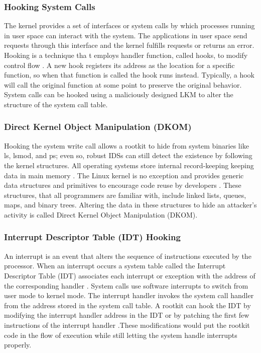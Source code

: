 \subsubsection{Hooking System Calls}
The kernel provides a set  of  interfaces or system calls by which processes running
 in user space can interact with the system. The applications in user space send requests
 through this interface and the kernel fulfills requests or returns an error. Hooking is a technique tha
t employs handler function, called hooks, to modify
 control flow . A new hook registers its address as the location for a specific
function, so when that function is called the hook runs instead. Typically, a hook will call
 the original function at some point to preserve the original behavior. System calls can be
 hooked using a maliciously designed LKM to alter the structure of the system call table.

\subsubsection{Direct Kernel Object Manipulation (DKOM)}
Hooking the system write call allows a rootkit to hide from system binaries like
 ls, lsmod, and ps; even so, robust IDSs can still detect the existence by following the
 kernel structures. All operating systems store internal record-keeping
 keeping data in main
 memory . The Linux kernel is no exception and provides generic data structures
 and primitives to encourage code reuse by developers . These structures, that all
 programmers are familiar with, include linked lists, queues, maps, and binary trees.
 Altering the data in these structures to hide an attacker’s activity is called Direct Kernel
 Object Manipulation (DKOM).

\subsubsection{Interrupt Descriptor Table (IDT) Hooking}
An interrupt is an event that alters the sequence of instructions executed by the
 processor. When an interrupt occurs a system table called the Interrupt Descriptor Table
 (IDT) associates each interrupt or exception with the address of the corresponding
 handler . System calls use software interrupts to switch from user mode to kernel
 mode. The interrupt handler invokes the system call handler from the address stored in
 the system call table. A rootkit can hook the IDT by modifying the interrupt handler
 address in the IDT or by patching the first few instructions of the interrupt handler
.These modifications would put the rootkit code in the flow of execution while
 still letting the system handle interrupts properly.









